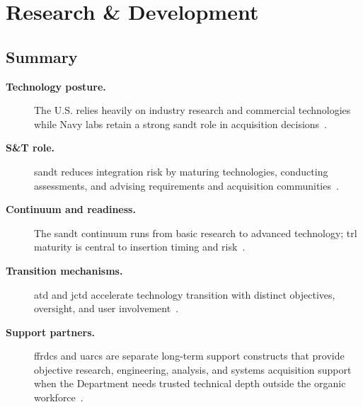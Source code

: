 \documentclass[../main.tex]{subfiles}
\begin{document}
\section{Research \& Development}

\subsection{Summary}
\begin{description}
  \item[\textbf{Technology posture.}] The U.S. relies heavily on industry research and commercial technologies while Navy labs retain a strong \ac{sandt} role in acquisition decisions~\autocite{edo-3-3-4-research-development-2025}.
  \item[\textbf{S\&T role.}] \ac{sandt} reduces integration risk by maturing technologies, conducting assessments, and advising requirements and acquisition communities~\autocite{edo-3-3-4-research-development-2025}.
  \item[\textbf{Continuum and readiness.}] The \ac{sandt} continuum runs from basic research to advanced technology; \ac{trl} maturity is central to insertion timing and risk~\autocite{edo-3-3-4-research-development-2025,USDRE-TRA-2025}.
  \item[\textbf{Transition mechanisms.}] \ac{atd} and \ac{jctd} accelerate technology transition with distinct objectives, oversight, and user involvement~\autocite{edo-3-3-4-research-development-2025}.
  \item[\textbf{Support partners.}] \acp{ffrdc} and \acp{uarc} are separate long-term support constructs that provide objective research, engineering, analysis, and systems acquisition support when the Department needs trusted technical depth outside the organic workforce~\autocite{edo-3-3-4-research-development-2025,DoW-FFRDC-UARC-2026}.
\end{description}
\end{document}
